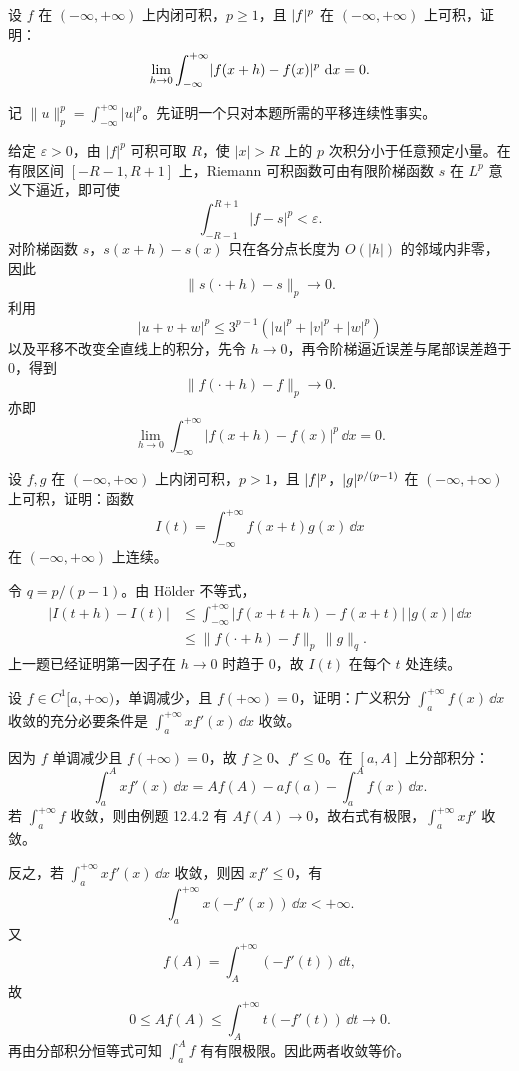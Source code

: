 \begin{xreferenceproblem}[3]
设 $f$ 在 $(-\infty,+\infty)$ 上内闭可积，$p\geq1$，且 $\lvert f\rvert^p$ 在 $(-\infty,+\infty)$ 上可积，证明：
  \[
    \lim_{h\to0}\int_{-\infty}^{+\infty}\lvert f(x+h)-f(x)\rvert^p\,\mathop{}\!\mathrm{d} x=0.
  \]
\end{xreferenceproblem}
\begin{xsolution}
记 $\|u\|_p^p=\int_{-\infty}^{+\infty}|u|^p$。先证明一个只对本题所需的平移连续性事实。

给定 $\varepsilon>0$，由 $|f|^p$ 可积可取 $R$，使 $|x|>R$ 上的 $p$ 次积分小于任意预定小量。在有限区间 $[-R-1,R+1]$ 上，Riemann 可积函数可由有限阶梯函数 $s$ 在 $L^p$ 意义下逼近，即可使
\[
  \int_{-R-1}^{R+1}|f-s|^p<\varepsilon.
\]
对阶梯函数 $s$，$s(x+h)-s(x)$ 只在各分点长度为 $O(|h|)$ 的邻域内非零，因此
\[
  \|s(\cdot+h)-s\|_p\to0.
\]
利用
\[
  |u+v+w|^p\leq3^{p-1}(|u|^p+|v|^p+|w|^p)
\]
以及平移不改变全直线上的积分，先令 $h\to0$，再令阶梯逼近误差与尾部误差趋于 $0$，得到
\[
  \|f(\cdot+h)-f\|_p\to0.
\]
亦即
\[
  \boxed{\lim_{h\to0}\int_{-\infty}^{+\infty}|f(x+h)-f(x)|^p\,\dd x=0}.
\]
\end{xsolution}


\begin{xreferenceproblem}[4]
设 $f,g$ 在 $(-\infty,+\infty)$ 上内闭可积，$p>1$，且 $\lvert f\rvert^p$，$\lvert g\rvert^{p/(p-1)}$ 在 $(-\infty,+\infty)$ 上可积，证明：函数
  \[
    I(t)=\int_{-\infty}^{+\infty}f(x+t)g(x)\,\dd x
  \]
  在 $(-\infty,+\infty)$ 上连续。
\end{xreferenceproblem}
\begin{xsolution}
令 $q=p/(p-1)$。由 H\"older 不等式，
\begin{align*}
  |I(t+h)-I(t)|
  &\leq\int_{-\infty}^{+\infty}|f(x+t+h)-f(x+t)|\,|g(x)|\,\dd x\\
  &\leq \|f(\cdot+h)-f\|_p\,\|g\|_q.
\end{align*}
上一题已经证明第一因子在 $h\to0$ 时趋于 $0$，故 $I(t)$ 在每个 $t$ 处连续。
\end{xsolution}


\begin{xreferenceproblem}[5]
设 $f\in C^1[a,+\infty)$，单调减少，且 $f(+\infty)=0$，证明：广义积分 $\int_a^{+\infty}f(x)\,\dd x$ 收敛的充分必要条件是 $\int_a^{+\infty}xf'(x)\,\dd x$ 收敛。
\end{xreferenceproblem}
\begin{xsolution}
因为 $f$ 单调减少且 $f(+\infty)=0$，故 $f\geq0$、$f'\leq0$。在 $[a,A]$ 上分部积分：
\[
  \int_a^A xf'(x)\,\dd x
  =Af(A)-af(a)-\int_a^A f(x)\,\dd x.
\]
若 $\int_a^{+\infty}f$ 收敛，则由例题 12.4.2 有 $Af(A)\to0$，故右式有极限，$\int_a^{+\infty}xf'$ 收敛。

反之，若 $\int_a^{+\infty}xf'(x)\,\dd x$ 收敛，则因 $xf'\leq0$，有
\[
  \int_a^{+\infty}x(-f'(x))\,\dd x<+\infty.
\]
又
\[
  f(A)=\int_A^{+\infty}(-f'(t))\,\dd t,
\]
故
\[
  0\leq Af(A)\leq\int_A^{+\infty}t(-f'(t))\,\dd t\to0.
\]
再由分部积分恒等式可知 $\int_a^A f$ 有有限极限。因此两者收敛等价。
\end{xsolution}


